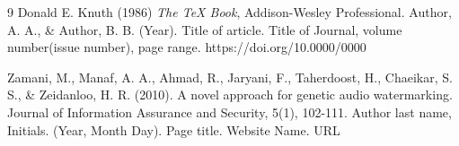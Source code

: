 \begin{thebibliography}{9}
Donald E. Knuth (1986) \emph{The \TeX{} Book}, Addison-Wesley Professional.
Author, A. A., \& Author, B. B. (Year). Title of article. Title of Journal, volume number(issue number), page range. https://doi.org/10.0000/0000

 Zamani, M., Manaf, A. A., Ahmad, R., Jaryani, F., Taherdoost, H., Chaeikar, S. S., \& Zeidanloo, H. R. (2010). A novel approach for genetic audio watermarking. Journal of Information Assurance and Security, 5(1), 102-111.
Author last name, Initials. (Year, Month Day). Page title. Website Name. URL

\end{thebibliography}
